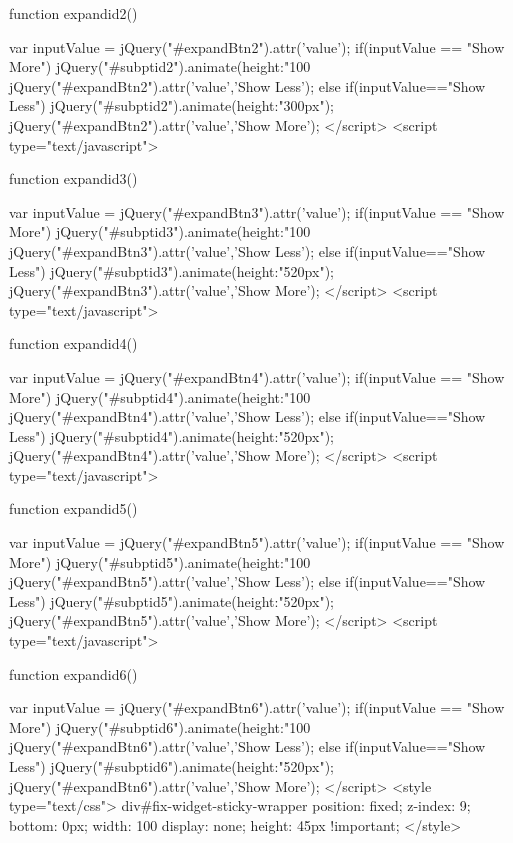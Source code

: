 {{  function expandid2(){
      var inputValue = jQuery("#expandBtn2").attr('value');
        if(inputValue == "Show More"){
          jQuery("#subptid2").animate({height:"100%
          jQuery("#expandBtn2").attr('value','Show Less');
      }
      else if(inputValue=="Show Less")
      {
          jQuery("#subptid2").animate({height:"300px"});
          jQuery("#expandBtn2").attr('value','Show More');
      }
  }
</script>
<script type="text/javascript">

  function expandid3(){
      var inputValue = jQuery("#expandBtn3").attr('value');
        if(inputValue == "Show More"){
          jQuery("#subptid3").animate({height:"100%
          jQuery("#expandBtn3").attr('value','Show Less');
      }
      else if(inputValue=="Show Less")
      {
          jQuery("#subptid3").animate({height:"520px"});
          jQuery("#expandBtn3").attr('value','Show More');
      }
  }
</script>
<script type="text/javascript">

  function expandid4(){
      var inputValue = jQuery("#expandBtn4").attr('value');
        if(inputValue == "Show More"){
          jQuery("#subptid4").animate({height:"100%
          jQuery("#expandBtn4").attr('value','Show Less');
      }
      else if(inputValue=="Show Less")
      {
          jQuery("#subptid4").animate({height:"520px"});
          jQuery("#expandBtn4").attr('value','Show More');
      }
  }
</script>
<script type="text/javascript">

  function expandid5(){
      var inputValue = jQuery("#expandBtn5").attr('value');
        if(inputValue == "Show More"){
          jQuery("#subptid5").animate({height:"100%
          jQuery("#expandBtn5").attr('value','Show Less');
      }
      else if(inputValue=="Show Less")
      {
          jQuery("#subptid5").animate({height:"520px"});
          jQuery("#expandBtn5").attr('value','Show More');
      }
  }
</script>
<script type="text/javascript">

  function expandid6(){
      var inputValue = jQuery("#expandBtn6").attr('value');
        if(inputValue == "Show More"){
          jQuery("#subptid6").animate({height:"100%
          jQuery("#expandBtn6").attr('value','Show Less');
      }
      else if(inputValue=="Show Less")
      {
          jQuery("#subptid6").animate({height:"520px"});
          jQuery("#expandBtn6").attr('value','Show More');
      }
  }
</script>
<style type="text/css">
  div#fix-widget-sticky-wrapper {
      position: fixed;
      z-index: 9;
      bottom: 0px;
      width: 100%
      display: none;
      height: 45px !important;
  }
</style>

}}}}}}}
